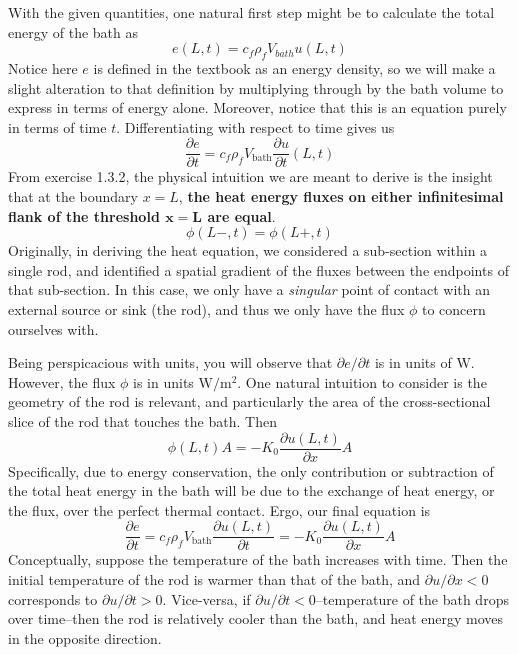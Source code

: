 \documentclass[a4paper]{article}
\begin{document}
With the given quantities, one natural first step might be to calculate the total energy of the bath as 
\[
	e \!\left( L,t \right) = c_{f}\rho_{f}V_{bath}u \!\left( L,t \right)
\]
Notice here \( e \) is defined in the textbook as an energy density, so we will make a slight alteration to that definition by multiplying through by the bath volume to express in terms of energy alone. Moreover, notice that this is an equation purely in terms of time \( t \). Differentiating with respect to time gives us
\[
	\frac{\partial e}{\partial t} = c_{f}\rho_{f}V_{\text{bath}}\frac{\partial u}{\partial t}\!\left( L,t \right) 
\]
From exercise 1.3.2, the physical intuition we are meant to derive is the insight that at the boundary \( x = L \), \textbf{the heat energy fluxes on either infinitesimal flank of the threshold \( \pmb{x = L} \) are equal}. 
\[
	\phi \!\left( L-,t \right) = \phi \!\left( L+,t \right)
\]
Originally, in deriving the heat equation, we considered a sub-section within a single rod, and identified a spatial gradient of the fluxes between the endpoints of that sub-section. In this case, we only have a \textit{singular} point of contact with an external source or sink (the rod), and thus we only have the flux \( \phi \) to concern ourselves with.

Being perspicacious with units, you will observe that \( \partial e / \partial t \) is in units of \( \text{W} \). However, the flux \( \phi \) is in units \( \text{W} / \text{m}^{2} \). One natural intuition to consider is the geometry of the rod is relevant, and particularly the area of the cross-sectional slice of the rod that touches the bath. Then
\[
	\phi \!\left( L,t \right)A = -K_{0} \frac{\partial u \!\left( L,t \right)}{\partial x}A
\]
Specifically, due to energy conservation, the only contribution or subtraction of the total heat energy in the bath will be due to the exchange of heat energy, or the flux, over the perfect thermal contact. Ergo, our final equation is
\[
	\frac{\partial e}{\partial t} = c_{f}\rho_{f}V_{\text{bath}}\frac{\partial u \!\left( L,t \right)}{\partial t} = -K_{0}\frac{\partial u \!\left( L,t \right)}{\partial x}A
\]
Conceptually, suppose the temperature of the bath increases with time. Then the initial temperature of the rod is warmer than that of the bath, and \( \partial u / \partial x < 0 \) corresponds to \( \partial u / \partial t > 0 \). Vice-versa, if \( \partial u / \partial t < 0 \)--temperature of the bath drops over time--then the rod is relatively cooler than the bath, and heat energy moves in the opposite direction.
\end{document}

